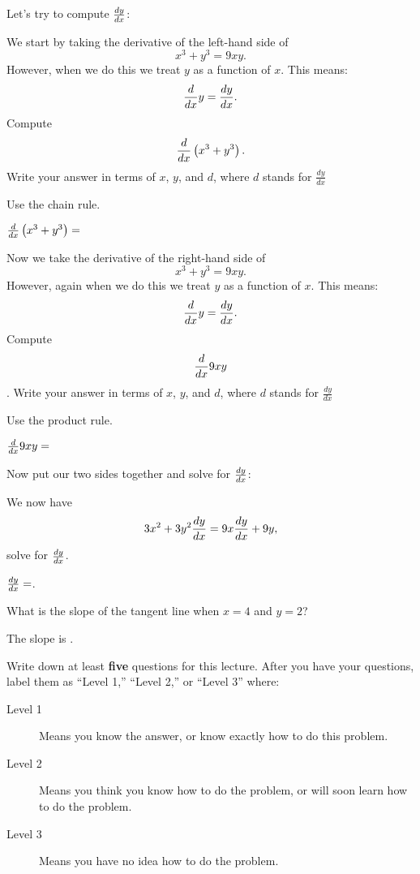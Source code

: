 \documentclass{ximera}
\begin{document}
Let's try to compute $\frac{dy}{dx}$:


\begin{question}
We start by taking the derivative of the left-hand side of 
\[
x^3+y^3 = 9xy.
\]
However, when we do this we treat $y$ as a function of $x$. This means:
\[
\frac{d}{dx} y = \frac{dy}{dx}.
\]
Compute 
\[
\frac{d}{dx} \left(x^3+y^3\right).
\] Write your answer in terms of $x$, $y$, and $d$, where $d$ stands for $\frac{dy}{dx}$
\begin{hint}
Use the chain rule.
\end{hint}
\begin{prompt}
$\frac{d}{dx} \left(x^3+y^3\right) = $
\end{prompt}
\end{question}

\begin{question}
Now we take the derivative of the right-hand side of 
\[
x^3+y^3 = 9xy.
\]
However, again when we do this we treat $y$ as a function of $x$. This
means:
\[
\frac{d}{dx} y = \frac{dy}{dx}.
\]
Compute 
\[
\frac{d}{dx} 9xy
\]. Write your answer in terms of $x$, $y$, and $d$, where $d$ stands for $\frac{dy}{dx}$
\begin{hint}
Use the product rule.
\end{hint}
\begin{prompt}
$\frac{d}{dx} 9xy= $
\end{prompt}
\end{question}


\begin{question}
Now put our two sides together and solve for $\frac{dy}{dx}$:
\begin{hint}
We now have 
\[
3x^2 + 3y^2\frac{dy}{dx}= 9x\frac{dy}{dx} + 9y,
\]
solve for $\frac{dy}{dx}$.
\end{hint}
\begin{prompt}
$\frac{dy}{dx}=$.
\end{prompt}
\end{question}


\begin{question}
What is the slope of the tangent line when $x=4$ and $y=2$?
\begin{prompt}
The slope is .
\end{prompt}
\end{question}


\begin{question}
Write down at least \textbf{five} questions for this lecture. After
you have your questions, label them as ``Level 1,'' ``Level 2,'' or ``Level 3'' where:
\begin{description}
\item[Level 1] Means you know the answer, or know exactly how to do this problem.
\item[Level 2] Means you think you know how to do the problem, or will soon learn how to do the problem.
\item[Level 3] Means you have no idea how to do the problem. 
\end{description}
  \begin{freeResponse}
  \end{freeResponse}
\end{question}
\end{document}
